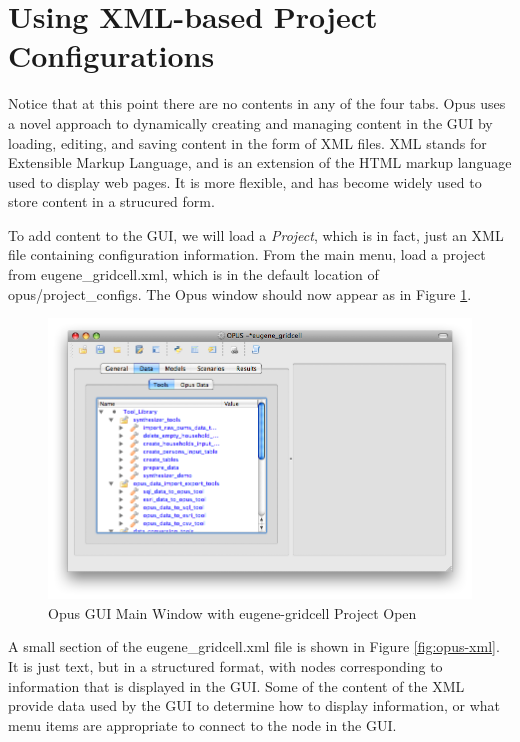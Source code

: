 \section{Using XML-based Project Configurations}
\label{chap:using-xml-based-project-configurations}

Notice that at this point there are no contents in any of the four tabs.  Opus uses a novel approach to dynamically creating and managing content in the GUI by loading, editing, and saving content in the form of XML files.  XML stands for Extensible Markup Language, and is an extension of the HTML markup language used to display web pages.  It is more flexible, and has become widely used to store content in a strucured form.  

To add content to the GUI, we will load a \emph{Project}, which is in fact, just an XML file containing configuration information.  From the main menu, load a project from eugene\_gridcell.xml, which is in the default location of opus/project\_configs.  The Opus window should now appear as in Figure \ref{fig:opus2}.

\begin{figure}[htp]
\begin{center}
\includegraphics[scale=0.52]{part-gui/images/opus-open-project.png}
\end{center}
\caption{Opus GUI Main Window with eugene-gridcell Project Open}
\label{fig:opus2}
\end{figure}

A small section of the eugene\_gridcell.xml file is shown in Figure \ref{fig:opus-xml}.  It is just text, but in a structured format, with nodes corresponding to information that is displayed in the GUI.  Some of the content of the XML provide data used by the GUI to determine how to display information, or what menu items are appropriate to connect to the node in the GUI.

